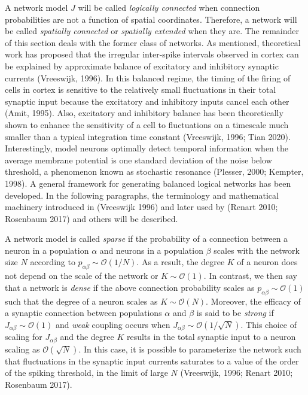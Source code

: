 \documentclass{ucetd}
\begin{document}
A network model $J$ will be called \emph{logically connected} when connection probabilities are not a function of spatial coordinates. Therefore, a network will be called \emph{spatially connected} or \emph{spatially extended} when they are. The remainder of this section deals with the former class of networks. As mentioned, theoretical work has proposed that the irregular inter-spike intervals observed in cortex can be explained by approximate balance of excitatory and inhibitory synaptic currents (Vreeswijk, 1996). In this balanced regime, the timing of the firing of cells in cortex is sensitive to the relatively small fluctuations in their total synaptic input because the excitatory and inhibitory inputs cancel each other (Amit, 1995). Also, excitatory and inhibitory balance has been theoretically shown to enhance the sensitivity of a cell to fluctuations on a timescale much smaller than a typical integration time constant (Vreeswijk, 1996; Tian 2020). Interestingly, model neurons optimally detect temporal information when the average membrane potential is one standard deviation of the noise below threshold, a phenomenon known as stochastic resonance (Plesser, 2000; Kempter, 1998). A general framework for generating balanced logical networks has been developed. In the following paragraphs, the terminology and mathematical machinery introduced in (Vreeswijk 1996) and later used by (Renart 2010; Rosenbaum 2017) and others will be described.

A network model is called \emph{sparse} if the probability of a connection between a neuron in a population $\alpha$ and neurons in a population $\beta$ scales with the network size $N$ according to $p_{\alpha\beta} \sim \mathcal{O}(1/N)$. As a result, the degree $K$ of a neuron does not depend on the scale of the network or $K \sim \mathcal{O}(1)$. In contrast, we then say that a network is \emph{dense} if the above connection probability scales as $p_{\alpha\beta} \sim \mathcal{O}(1)$ such that the degree of a neuron scales as $K \sim \mathcal{O}(N)$. Moreover, the efficacy of a synaptic connection between populations $\alpha$ and $\beta$ is said to be \emph{strong} if $J_{\alpha\beta} \sim \mathcal{O}(1)$ and \emph{weak} coupling occurs when $J_{\alpha\beta} \sim \mathcal{O}(1/\sqrt{N})$. This choice of scaling for $J_{\alpha\beta}$ and the degree $K$ results in the total synaptic input to a neuron scaling as $\mathcal{O}(\sqrt{N})$. In this case, it is possible to parameterize the network such that fluctuations in the synaptic input currents saturates to a value of the order of the spiking threshold, in the limit of large $N$ (Vreeswijk, 1996; Renart 2010; Rosenbaum 2017).  
\end{document}
